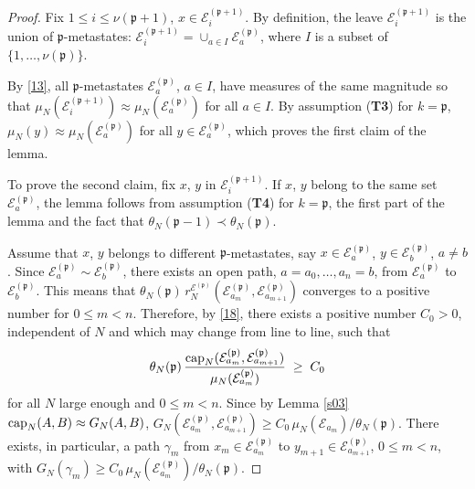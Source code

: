 \documentclass[reqno]{amsart}
\begin{document}
\begin{proof}
Fix $1\le i\le \nu({{\mathfrak p}}+1)$, $x\in {{\mathcal E}}^{({{\mathfrak p}} +1)}_i$. By
definition, the leave ${{\mathcal E}}^{({{\mathfrak p}} +1)}_i$ is the union of ${{\mathfrak p}}$-metastates: ${{\mathcal E}}^{({{\mathfrak p}} +1)}_i = \cup_{a\in I} {{\mathcal E}}^{({{\mathfrak p}})}_a$, where $I$ is a subset of $\{1, \dots, \nu({{\mathfrak p}})\}$. 

By \eqref{13}, all ${{\mathfrak p}}$-metastates ${{\mathcal E}}^{({{\mathfrak p}})}_a$, $a\in I$,
have measures of the same magnitude so that $\mu_N({{\mathcal E}}^{({{\mathfrak p}}
  +1)}_i) \approx \mu_N({{\mathcal E}}^{({{\mathfrak p}})}_a)$ for all $a\in I$. By
assumption ({\bf T3}) for $k={{\mathfrak p}}$, $\mu_N(y) \approx \mu_N({{\mathcal E}}^{({{\mathfrak p}})}_a)$ for all $y\in {{\mathcal E}}^{({{\mathfrak p}})}_a$, which proves the
first claim of the lemma.

To prove the second claim, fix $x$, $y$ in ${{\mathcal E}}^{({{\mathfrak p}} +1)}_i$. If
$x$, $y$ belong to the same set ${{\mathcal E}}^{({{\mathfrak p}})}_a$, the lemma follows
from assumption ({\bf T4}) for $k={{\mathfrak p}}$, the first part of the lemma
and the fact that $\theta_N({{\mathfrak p}}-1) \prec \theta_N({{\mathfrak p}})$.

Assume that $x$, $y$ belongs to different ${{\mathfrak p}}$-metastates, say
$x\in {{\mathcal E}}^{({{\mathfrak p}})}_a$, $y\in {{\mathcal E}}^{({{\mathfrak p}})}_b$, $a\not = b$. Since
${{\mathcal E}}^{({{\mathfrak p}})}_a \sim {{\mathcal E}}^{({{\mathfrak p}})}_b$, there exists an open path,
$a=a_0, \dots, a_n = b$, from ${{\mathcal E}}^{({{\mathfrak p}})}_a$ to ${{\mathcal E}}^{({{\mathfrak p}})}_b$. This means that $\theta_N({{\mathfrak p}}) \, r^{{{\mathcal E}}^{({{\mathfrak p}})}}_N({{\mathcal E}}^{({{\mathfrak p}})}_{a_m}, {{\mathcal E}}^{({{\mathfrak p}})}_{a_{m+1}})$
converges to a positive number for $0\le m <n$. Therefore, by
\eqref{18}, there exists a positive number $C_0>0$, independent of $N$
and which may change from line to line, such that
\begin{equation*}
\theta_N({{\mathfrak p}}) \, \frac{{{\rm cap}}_N({{\mathcal E}}^{({{\mathfrak p}})}_{a_m},
{{\mathcal E}}^{({{\mathfrak p}})}_{a_{m+1}})}{\mu_N({{\mathcal E}}^{({{\mathfrak p}})}_{a_m})} \;\ge\; C_0
\end{equation*}
for all $N$ large enough and $0\le m <n$.  Since by Lemma \ref{s03}
${{\rm cap}}_N (A,B) \approx G_N (A,B)$, $G_N({{\mathcal E}}^{({{\mathfrak p}})}_{a_m}, {{\mathcal E}}^{({{\mathfrak p}})}_{a_{m+1}}) \ge C_0 \, \mu_N({{\mathcal E}}_{a_m})/ \theta_N({{\mathfrak p}})$. There exists, in particular, a path $\gamma_m$ from $x_m\in {{\mathcal E}}^{({{\mathfrak p}})}_{a_m}$ to $y_{m+1}\in {{\mathcal E}}^{({{\mathfrak p}})}_{a_{m+1}}$, $0\le m
<n$, with $G_N(\gamma_m) \ge C_0\, \mu_N({{\mathcal E}}^{({{\mathfrak p}})}_{a_m})/
\theta_N({{\mathfrak p}})$.


\end{proof}
\end{document}
